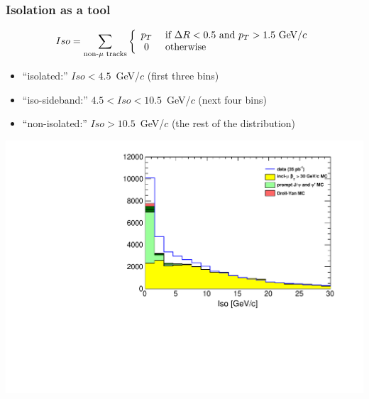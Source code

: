 \documentclass[compress]{beamer}
\newcommand{\s}[1]{{\mbox{\scriptsize #1}}}
\begin{document}
\begin{frame}
\frametitle{Isolation as a tool}

\[ Iso = \sum_\s{non-$\mu$ tracks} \left\{ \begin{array}{c l} p_T &
  \mbox{ if $\Delta R < 0.5$ and $p_T > 1.5$ GeV/$c$} \\ 0 &
  \mbox{ otherwise} \end{array} \right. \]

\begin{itemize}
\item ``isolated:'' $Iso < 4.5$~GeV/$c$ (first three bins)
\item ``iso-sideband:'' $4.5 < Iso < 10.5$~GeV/$c$ (next four bins)
\item ``non-isolated:'' $Iso > 10.5$~GeV/$c$ (the rest of the distribution)
\end{itemize}

\begin{center}
\includegraphics[width=0.6\linewidth]{lowdimuon_isodistribution.pdf}
\end{center}
\end{frame}
\end{document}
